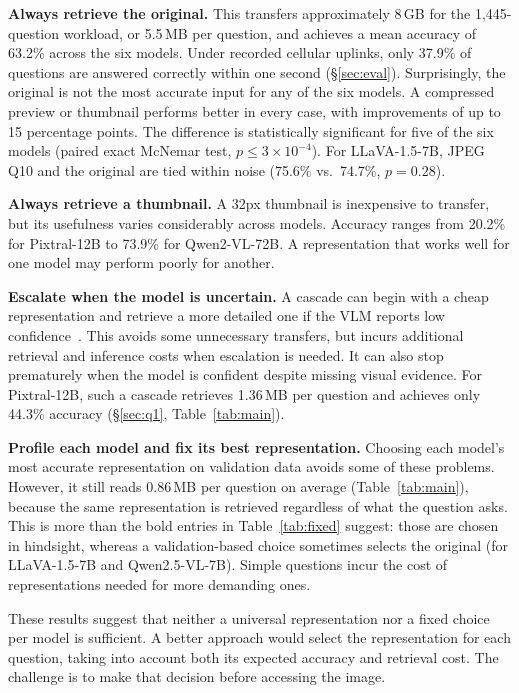 \documentclass[10pt,conference]{IEEEtran}
\newcommand{\mLlava}{LLaVA-1.5-7B\xspace}
\newcommand{\mPix}{Pixtral-12B\xspace}
\newcommand{\mQSevTwo}{Qwen2-VL-72B\xspace}
\newcommand{\mQSev}{Qwen2.5-VL-7B\xspace}
\begin{document}
\textbf{Always retrieve the original.} This transfers approximately 8\,GB for the 1,445-question workload, or 5.5\,MB per question, and achieves a mean accuracy of 63.2\% across the six models. Under recorded cellular uplinks, only 37.9\% of questions are answered correctly within one second (\S\ref{sec:eval}). Surprisingly, the original is not the most accurate input for any of the six models. A compressed preview or thumbnail performs better in every case, with improvements of up to 15 percentage points. The difference is statistically significant for five of the six models (paired exact McNemar test, $p\le 3\times10^{-4}$). For \mLlava, JPEG Q10 and the original are tied within noise (75.6\% vs.\ 74.7\%, $p=0.28$).

\textbf{Always retrieve a thumbnail.} A 32px thumbnail is inexpensive to transfer, but its usefulness varies considerably across models. Accuracy ranges from 20.2\% for \mPix to 73.9\% for \mQSevTwo. A representation that works well for one model may perform poorly for another.

\textbf{Escalate when the model is uncertain.} A cascade can begin with a cheap representation and retrieve a more detailed one if the VLM reports low confidence~\cite{chen2023frugalgpt}. This avoids some unnecessary transfers, but incurs additional retrieval and inference costs when escalation is needed. It can also stop prematurely when the model is confident despite missing visual evidence. For \mPix, such a cascade retrieves 1.36\,MB per question and achieves only 44.3\% accuracy (\S\ref{sec:q1}, Table~\ref{tab:main}).

\textbf{Profile each model and fix its best representation.} Choosing each model's most accurate representation on validation data avoids some of these problems. However, it still reads 0.86\,MB per question on average (Table~\ref{tab:main}), because the same representation is retrieved regardless of what the question asks. This is more than the bold entries in Table~\ref{tab:fixed} suggest: those are chosen in hindsight, whereas a validation-based choice sometimes selects the original (for \mLlava and \mQSev). Simple questions incur the cost of representations needed for more demanding ones.

These results suggest that neither a universal representation nor a fixed choice per model is sufficient. A better approach would select the representation for each question, taking into account both its expected accuracy and retrieval cost. The challenge is to make that decision before accessing the image.
\end{document}
